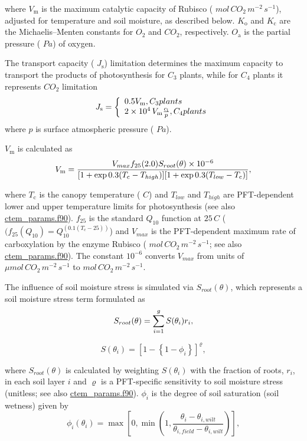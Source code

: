 where $V_\mathrm{m}$ is the maximum catalytic capacity of Rubisco ( $mol\,CO_2\,m^{-2}\,s^{-1}$), adjusted for temperature and soil moisture, as described below. $K_\mathrm{o}$ and $K_\mathrm{c}$ are the Michaelis--Menten constants for $O_2$ and $CO_2$, respectively. $O_\mathrm{a}$ is the partial pressure ( $Pa$) of oxygen.

The transport capacity ( $J_\mathrm{s}$) limitation determines the maximum capacity to transport the products of photosynthesis for $C_3$ plants, while for $C_4$ plants it represents $CO_2$ limitation \[ \label{J_s} J_\mathrm{s} = \left\{\begin{array}{l l} 0.5 V_\mathrm{m}, C_3 plants\\ 2 \times 10^4\,V_\mathrm{m} \frac{c_\mathrm{i}}{p}, C_4 plants \end{array} \right. \] where $p$ is surface atmospheric pressure ( $Pa$).

$V_\mathrm{m}$ is calculated as \[ V_\mathrm{m} = \nonumber \\ \frac{V_{max}f_{25}(2.0)S_{root}(\theta) \times 10^{-6}} {[1+ \exp{0.3(T_\mathrm{c} - T_{high})}][1 + \exp{0.3(T_{low} - T_\mathrm{c})}]},\label{V_m} \]

where $T_\mathrm{c}$ is the canopy temperature ( $C$) and $T_{low}$ and $T_{high}$ are P\+F\+T-\/dependent lower and upper temperature limits for photosynthesis (see also \hyperlink{ctem__params_8f90}{ctem\+\_\+params.\+f90}). $f_{25}$ is the standard $Q_{10}$ function at $25\,C$ ( $(f_{25}(Q_{10}) = Q^{(0.1(T_\mathrm{c}-25))}_{10}$) and $V_{max}$ is the P\+F\+T-\/dependent maximum rate of carboxylation by the enzyme Rubisco ( $mol\,CO_2\,m^{-2}\,s^{-1}$; see also \hyperlink{ctem__params_8f90}{ctem\+\_\+params.\+f90}). The constant $10^{-6}$ converts $V_{max}$ from units of ${\mu}mol\,CO_2\,m^{-2}\,s^{-1}$ to $mol\,CO_2\,m^{-2}\,s^{-1}$.

The influence of soil moisture stress is simulated via $S_{root}(\theta)$, which represents a soil moisture stress term formulated as \[ S_{root}(\theta) = \sum_{i=1}^g S(\theta_i) r_{i}, \vspace*{-4mm} \]

\[ \label{soilmoist_str} S(\theta_i) = \left[1 - \left\{1 - \phi_i \right\}\right]^\varrho, \]

where $S_{root}(\theta)$ is calculated by weighting $S(\theta_i)$ with the fraction of roots, $r_{i}$, in each soil layer $i$ and $\varrho$ is a P\+F\+T-\/specific sensitivity to soil moisture stress (unitless; see also \hyperlink{ctem__params_8f90}{ctem\+\_\+params.\+f90}). $\phi_i$ is the degree of soil saturation (soil wetness) given by \[ \label{phitheta} \phi_{i}(\theta_{i}) = \max \left[0, \min \left(1, \frac{\theta_{i} - \theta_{i, wilt}}{\theta_{i, field} - \theta_{i, wilt}} \right) \right], \]

